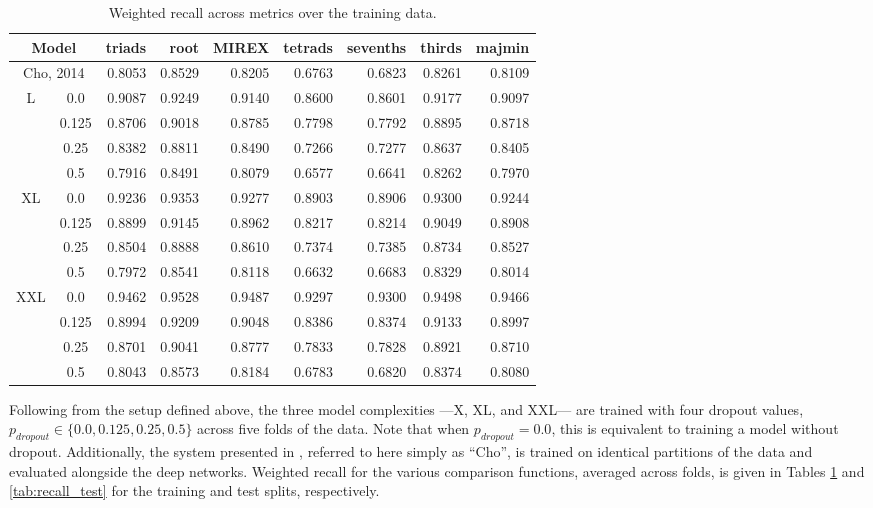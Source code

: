 \begin{table}[t]
\scriptsize
\begin{center}
\caption{Weighted recall across metrics over the training data.}
\label{tab:recall_train}
\begin{tabular}{cc|rrrrrrr}

\hline
 \multicolumn{2}{c|}{Model} &   triads &   root &  MIREX &   tetrads &   sevenths &   thirds &   majmin \\
\hline
\hline
\multicolumn{2}{c|}{Cho, 2014} &   0.8053 & 0.8529 &  0.8205 &    0.6763 &     0.6823 &   0.8261 &   0.8109 \\
\hline
 L &  0.0 & 0.9087 & 0.9249 &  0.9140 & 0.8600 & 0.8601 &   0.9177 &   0.9097 \\
 & 0.125 &   0.8706 & 0.9018 &  0.8785 &    0.7798 &     0.7792 &   0.8895 &   0.8718 \\
 &  0.25 &   0.8382 & 0.8811 &  0.8490 &    0.7266 &     0.7277 &   0.8637 &   0.8405 \\
 & 0.5 &   0.7916 & 0.8491 &  0.8079 &    0.6577 &     0.6641 &   0.8262 &   0.7970 \\
\hline
  XL &   0.0 &   0.9236 & 0.9353 &  0.9277 &    0.8903 &     0.8906 &   0.9300 &   0.9244 \\
   &  0.125 &   0.8899 & 0.9145 &  0.8962 &    0.8217 &     0.8214 &   0.9049 &   0.8908 \\
   &  0.25 &   0.8504 & 0.8888 &  0.8610 &    0.7374 &     0.7385 &   0.8734 &   0.8527 \\
   &  0.5 &   0.7972 & 0.8541 &  0.8118 &    0.6632 &     0.6683 &   0.8329 &   0.8014 \\
\hline
  XXL &  0.0 &   0.9462 & 0.9528 & 0.9487 &    0.9297 &     0.9300 &   0.9498 &   0.9466 \\
   &   0.125 &   0.8994 & 0.9209 &  0.9048 &    0.8386 &     0.8374 &   0.9133 &   0.8997 \\
   &   0.25 &   0.8701 & 0.9041 & 0.8777 &    0.7833 &     0.7828 &   0.8921 &   0.8710 \\
   &   0.5 &   0.8043 & 0.8573 &  0.8184 &    0.6783 &     0.6820 &   0.8374 &   0.8080 \\
\hline
\end{tabular}
\end{center}
\end{table}

Following from the setup defined above, the three model complexities ---X, XL, and XXL--- are trained with four dropout values, $p_{dropout} \in \{0.0, 0.125, 0.25, 0.5\}$ across five folds of the data.
Note that when $p_{dropout} = 0.0$, this is equivalent to training a model without dropout.
Additionally, the system presented in \cite{Cho2014PhD}, referred to here simply as ``Cho'', is trained on identical partitions of the data and evaluated alongside the deep networks.
Weighted recall for the various comparison functions, averaged across folds, is given in Tables \ref{tab:recall_train} and \ref{tab:recall_test} for the training and test splits, respectively.


